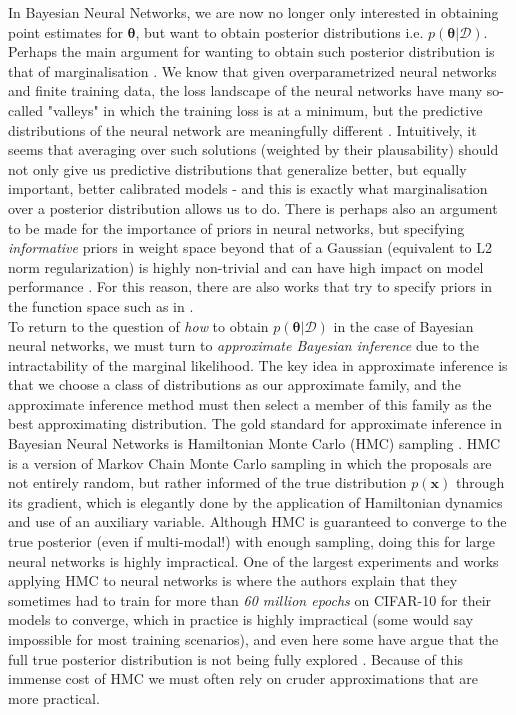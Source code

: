 In Bayesian Neural Networks, we are now no longer only interested in obtaining point estimates for $\bm{\theta}$, but want to obtain posterior distributions i.e. $p(\bm{\theta}|\mathcal{D})$. Perhaps the main argument for wanting to obtain such posterior distribution is that of marginalisation \citep{2020_AGWCaseBNN}. We know that given overparametrized neural networks and finite training data, the loss landscape of the neural networks have many so-called "valleys" in which the training loss is at a minimum, but the predictive distributions of the neural network are meaningfully different \citep{2018_GaripovLossValleys}. Intuitively, it seems that averaging over such solutions (weighted by their plausability) should not only give us predictive distributions that generalize better, but equally important, better calibrated models - and this is exactly what marginalisation over a posterior distribution allows us to do. There is perhaps also an argument to be made for the importance of priors in neural networks, but specifying \textit{informative} priors in weight space beyond that of a Gaussian (equivalent to L2 norm regularization) is highly non-trivial and can have high impact on model performance \citep{2016_PACBayesPriors, 2018_InvariancesPriorWilk, 2022_revisingBNNPriors}. For this reason, there are also works that try to specify priors in the function space such as in \cite{2024_functionalpriorslaplace}. \\

\noindent To return to the question of \textit{how} to obtain $p(\bm{\theta}|\mathcal{D})$ in the case of Bayesian neural networks, we must turn to \textit{approximate Bayesian inference} due to the intractability of the marginal likelihood. The key idea in approximate inference is that we choose a class of distributions as our approximate family, and the approximate inference method must then select a member of this family as the best approximating distribution. The gold standard for approximate inference in Bayesian Neural Networks is Hamiltonian Monte Carlo (HMC) sampling \citep{1987_HybridMC, neal1996hmc}. HMC is a version of Markov Chain Monte Carlo sampling in which the proposals are not entirely random, but rather informed of the true distribution $p(\mathbf{x})$ through its gradient, which is elegantly done by the application of Hamiltonian dynamics \citep{hamilton1833general} and use of an auxiliary variable. Although HMC is guaranteed to converge to the true posterior (even if multi-modal!) with enough sampling, doing this for large neural networks is highly impractical. One of the largest experiments and works applying HMC to neural networks is \cite{Izmailov2021WhatAB} where the authors explain that they sometimes had to train for more than \textit{60 million epochs} on CIFAR-10 for their models to converge, which in practice is highly impractical (some would say impossible for most training scenarios), and even here some have argue that the full true posterior distribution is not being fully explored \citep{SharmaFNR23}. Because of this immense cost of HMC we must often rely on cruder approximations that are more practical.\\

